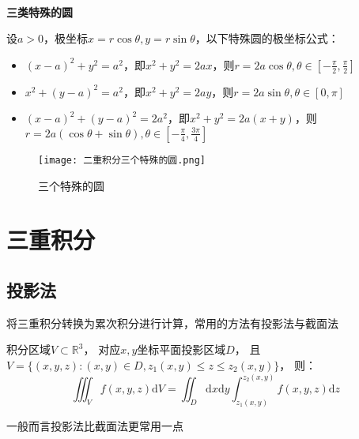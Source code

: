 ~

\noindent \textbf{三类特殊的圆}

\begin{theorem}[三类特殊圆极坐标]
  设$a > 0$，极坐标$x = r\cos \theta, y = r \sin \theta$，以下特殊圆的极坐标公式：
  \begin{itemize}
  \item $(x - a)^2 + y^2 = a^2$，即$x^2 + y^2 = 2ax$，则$r = 2a \cos \theta, \theta \in [-\frac{\pi}{2}, \frac{\pi}{2}]$
  \item $x^2 + (y-a)^2 = a^2$，即$x^2 + y^2 = 2ay$，则$r = 2a \sin \theta, \theta \in [0,\pi]$
  \item $(x - a)^2 + (y-a)^2 = 2a^2$，即$x^2 + y^2 = 2a(x+y)$，则$r = 2a(\cos \theta + \sin\theta), \theta \in [-\frac{\pi}{4}, \frac{3\pi}{4}]$
  \end{itemize}
\end{theorem}

\begin{figure}[htp]
  \centering
  \texttt{[image: 二重积分三个特殊的圆.png]}
  \caption{三个特殊的圆}
\end{figure}





\section{三重积分}

\subsection{投影法}

将三重积分转换为累次积分进行计算，常用的方法有投影法与截面法

\begin{theorem}[投影法]
  积分区域$V　\subset \mathbb{R}^3$，
  对应$x,y$坐标平面投影区域$D$，
  且$V = \{(x,y,z):(x,y) \in D, z_1(x,y) \leq z \leq z_2(x,y)\}$，
  则：
  \begin{equation*}
    \iiint _V f(x,y,z) \mathrm{d}V = \iint _D \mathrm{d}x \mathrm{d}y \int _{z_1(x,y)}^{z_2(x,y)}f(x,y,z)\mathrm{d}z
  \end{equation*}
\end{theorem}

\begin{note}
  一般而言投影法比截面法更常用一点
\end{note}

